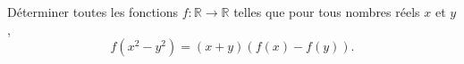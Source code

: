 \documentclass[varwidth]{standalone}
\begin{document}
    D\'eterminer toutes les fonctions $f: \mathbb{R} \to \mathbb{R}$ telles que pour tous nombres r\'eels $x$ et $y$,
    \[
        f\left( x^2 - y^2 \right) = (x + y)(f(x) - f(y)).   
    \]
\end{document}
